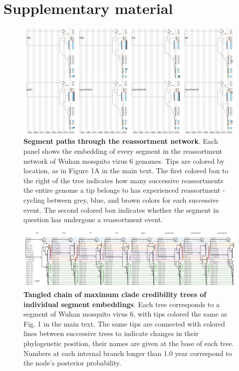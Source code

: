 \documentclass[11pt,twocolumn]{article}
\begin{document}



\onecolumn

\setcounter{figure}{0}
\setcounter{table}{0}
\renewcommand{\thefigure}{S\arabic{figure}}
\renewcommand{\thetable}{S\arabic{table}}


\newpage

\section{Supplementary material}

\pagebreak

\begin{figure}
\centering
\includegraphics[width=\textwidth]{SuppFig1_clonal.png}
\caption{
\textbf{Segment paths through the reassortment network}.
Each panel shows the embedding of every segment in the reassortment network of Wuhan mosquito virus 6 genomes.
Tips are colored by location, as in Figure 1A in the main text.
The first colored box to the right of the tree indicates how many successive reassortments the entire genome a tip belongs to has experienced reassortment - cycling between grey, blue, and brown colors for each successive event.
The second colored box indicates whether the segment in question has undergone a reassortment event.
}
\end{figure}

\begin{figure}
\centering
\includegraphics[width=\textwidth]{SuppFig2_BayesTangle.png}
\caption{
\textbf{Tangled chain of maximum clade credibility trees of individual segment embeddings}.
Each tree corresponds to a segment of Wuhan mosquito virus 6, with tips colored the same as Fig. 1 in the main text.
The same tips are connected with colored lines between successive trees to indicate changes in their phylogenetic position, their names are given at the base of each tree.
Numbers at each internal branch longer than 1.0 year correspond to the node's posterior probability.
}
\end{figure}
\end{document}
